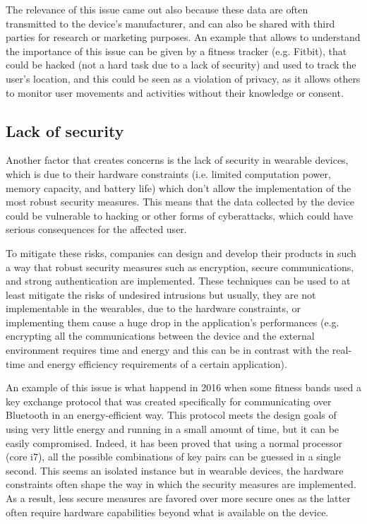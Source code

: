 \documentclass{article}
\begin{document}
The relevance of this issue came out also because these data are often transmitted to the device's manufacturer, and can also be shared with third parties for research or marketing purposes. An example that allows to understand the importance of this issue can be given by a fitness tracker (e.g. Fitbit), that could be hacked (not a hard task due to a lack of security) and used to track the user's location, and this could be seen as a violation of privacy, as it allows others to monitor user movements and activities without their knowledge or consent. 

\subsection{Lack of security}
Another factor that creates concerns is the lack of security in wearable devices, which is due to their hardware constraints (i.e. limited computation power, memory capacity, and battery life) which don’t allow the implementation of the most robust security measures. This means that the data collected by the device could be vulnerable to hacking or other forms of cyberattacks, which could have serious consequences for the affected user.

To mitigate these risks, companies can design and develop their products in such a way that robust security measures such as encryption, secure communications, and strong authentication are implemented. These techniques can be used to at least mitigate the risks of undesired intrusions but usually, they are not implementable in the wearables, due to the hardware constraints, or implementing them cause a huge drop in the application's performances (e.g. encrypting all the communications between the device and the external environment requires time and energy and this can be in contrast with the real-time and energy efficiency requirements of a certain application). 

An example of this issue is what happend in 2016 when some fitness bands used a key exchange protocol that was created specifically for communicating over Bluetooth in an energy-efficient way. This protocol meets the design goals of using very little energy and running in a small amount of time, but it can be easily compromised. Indeed, it has been proved that using a normal processor (core i7), all the possible combinations of key pairs can be guessed in a single second.\cite{noauthor_are_nodate} This seems an isolated instance but in wearable devices, the hardware constraints often shape the way in which the security measures are implemented. As a result, less secure measures are favored over more secure ones as the latter often require hardware capabilities beyond what is available on the device.
\end{document}
